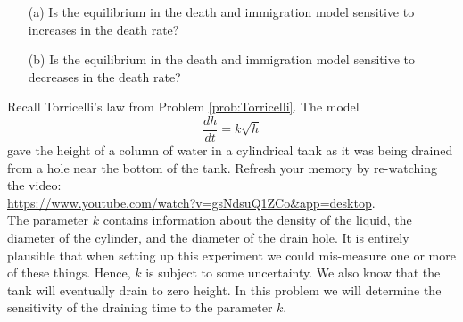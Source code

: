 \begin{problem}
    \begin{enumerate}
        \item[(a)] Is the equilibrium in the death and immigration model sensitive to
            increases in the death rate? 
        \item[(b)] Is the equilibrium in the death and immigration model sensitive to
            decreases in the death rate? 
    \end{enumerate}
\end{problem}



\begin{problem}
    Recall Torricelli's law from Problem \ref{prob:Torricelli}.  The model 
    \[ \frac{dh}{dt} = k \sqrt{h} \]
    gave the height of a column of water in a cylindrical tank as it was being drained
    from a hole near the bottom of the tank.  Refresh your memory by re-watching the
    video:\\
    \href{https://www.youtube.com/watch?v=gsNdsuQ1ZCo&app=desktop}{https://www.youtube.com/watch?v=gsNdsuQ1ZCo\&app=desktop}.
    \\
    The parameter $k$ contains information about the density of the liquid, the diameter
    of the cylinder, and the diameter of the drain hole.  It is entirely plausible that
    when setting up this experiment we could mis-measure one or more of these things.
    Hence, $k$ is subject to some uncertainty.  We also know that the tank will eventually
    drain to zero height.  In this problem we will determine the sensitivity of the
    draining time to the parameter $k$.


\end{problem}
